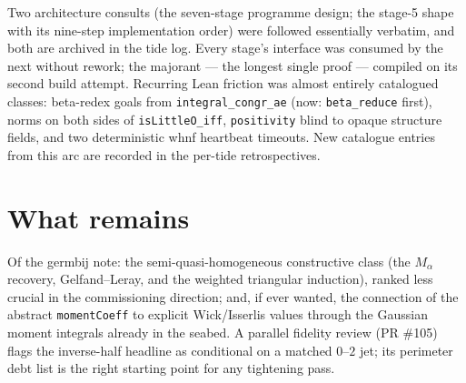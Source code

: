 \documentclass[11pt]{article}
\newcommand{\code}[1]{\texttt{#1}}
\begin{document}
Two architecture consults (the seven-stage programme design; the
stage-5 shape with its nine-step implementation order) were followed
essentially verbatim, and both are archived in the tide log. Every
stage's interface was consumed by the next without rework; the
majorant --- the longest single proof --- compiled on its second
build attempt. Recurring Lean friction was almost entirely
catalogued classes: beta-redex goals from \code{integral\_congr\_ae}
(now: \code{beta\_reduce} first), norms on both sides of
\code{isLittleO\_iff}, \code{positivity} blind to opaque structure
fields, and two deterministic whnf heartbeat timeouts. New catalogue
entries from this arc are recorded in the per-tide retrospectives.

\section{What remains}

Of the germbij note: the semi-quasi-homogeneous constructive class
(the $M_\alpha$ recovery, Gelfand--Leray, and the weighted triangular
induction), ranked less crucial in the commissioning direction; and,
if ever wanted, the connection of the abstract \code{momentCoeff} to
explicit Wick/Isserlis values through the Gaussian moment integrals
already in the seabed. A parallel fidelity review (PR \#105) flags
the inverse-half headline as conditional on a matched $0$--$2$ jet;
its perimeter debt list is the right starting point for any
tightening pass.
\end{document}
